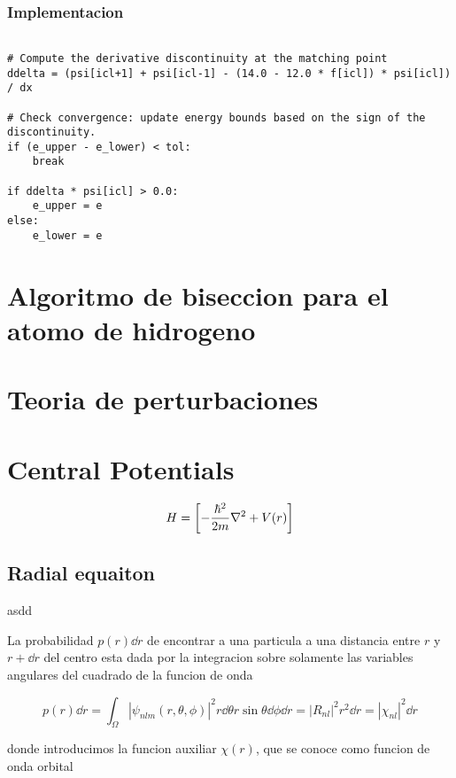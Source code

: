 \documentclass[11pt]{article}
\begin{document}
\subsubsection{Implementacion}
\label{sec:orga8c1947}

\begin{verbatim}

# Compute the derivative discontinuity at the matching point
ddelta = (psi[icl+1] + psi[icl-1] - (14.0 - 12.0 * f[icl]) * psi[icl]) / dx

# Check convergence: update energy bounds based on the sign of the discontinuity.
if (e_upper - e_lower) < tol:
    break

if ddelta * psi[icl] > 0.0:
    e_upper = e
else:
    e_lower = e

\end{verbatim}
\section{Algoritmo de biseccion para el atomo de hidrogeno}
\label{sec:orgb898030}



\section{Teoria de perturbaciones}
\label{sec:org81335a7}

\section{Central Potentials}
\label{sec:org575117b}

\[ H = \qty[ - \frac{\hbar^2}{2m}\nabla^2 + V(r)] \]
\subsection{Radial equaiton}
\label{sec:org0769d34}

asdd

La probabilidad \(p(r) \dd{r}\) de encontrar a una particula a una distancia entre \(r\) y \(r + \dd{r}\) del centro esta dada por la integracion sobre solamente las variables angulares del cuadrado de la funcion de onda

\[ p(r) \dd{r} = \int_{\Omega} |\psi_{nlm}(r,\theta,\phi)|^2 r \dd{\theta}r\sin\theta\dd{\phi} \dd{r} = |R_{nl}|^2 r^2 \dd{r} = |\chi_{nl}|^2 \dd{r}  \]

donde introducimos la funcion auxiliar \(\chi(r)\), que se conoce como funcion de onda orbital
\end{document}
